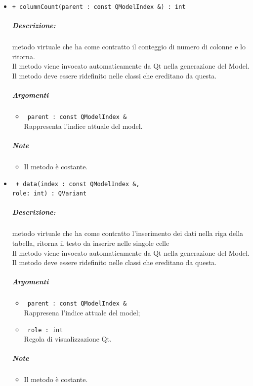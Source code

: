 {\begin{itemize}
	\item \color{blue}\verb!+ columnCount(parent : const QModelIndex &) : int!\\
	\color{black}
	\subparagraph{Descrizione:} metodo virtuale che ha come contratto il conteggio di numero di colonne e lo ritorna.\\
	Il metodo viene invocato automaticamente da Qt\g{} nella generazione del Model.\\
	Il metodo deve essere ridefinito nelle classi che ereditano da questa.\\
	\subparagraph{Argomenti}
		\begin{itemize}
			\item \color{RoyalPurple}\verb! parent : const QModelIndex &!\\
			\color{black}Rappresenta l'indice attuale del model.
		\end{itemize}
	\subparagraph{Note}
			\begin{itemize}
				\item Il metodo è costante.
			\end{itemize}
		
	\item \color{blue}\verb! + data(index : const QModelIndex &, !\\
					\verb!role: int) : QVariant!\\
	\color{black}
	\subparagraph{Descrizione:} metodo virtuale che ha come contratto l'inserimento dei dati nella riga della tabella, ritorna il testo da inserire nelle singole celle\\
		Il metodo viene invocato automaticamente da Qt\g{} nella generazione del Model.\\
		Il metodo deve essere ridefinito nelle classi che ereditano da questa.\\
	\subparagraph{Argomenti}
		\begin{itemize}
			\item \color{RoyalPurple}\verb! parent : const QModelIndex &!\\
			\color{black}Rappresena l'indice attuale del model;
			
			\item \color{RoyalPurple}\verb! role : int!\\
			\color{black}Regola di visualizzazione Qt\g{}.
		\end{itemize}
	\subparagraph{Note}
			\begin{itemize}
				\item Il metodo è costante.
			\end{itemize}
		

\end{itemize}}
